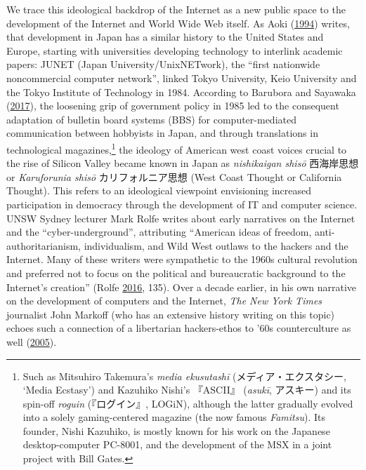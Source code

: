 \documentclass[10pt,british,A4paper,twoside]{memoir}
\begin{document}
We trace this ideological backdrop of the Internet as a new public space
to the development of the Internet and World Wide Web itself. As Aoki
(\protect\hyperlink{ref-aoki_virtual_1994}{1994}) writes, that
development in Japan has a similar history to the United States and
Europe, starting with universities developing technology to interlink
academic papers: JUNET (Japan University/UnixNETwork), the ``first
nationwide noncommercial computer network'', linked Tokyo University,
Keio University and the Tokyo Institute of Technology in 1984. According
to Barubora and Sayawaka
(\protect\hyperlink{ref-barubora_eng:_2017}{2017}), the loosening grip
of government policy in 1985 led to the consequent adaptation of
bulletin board systems (BBS) for computer-mediated communication between
hobbyists in Japan, and through translations in technological
magazines,\footnote{Such as Mitsuhiro Takemura's \emph{media ekusutashī}
  (メディア・エクスタシー, `Media Ecstasy') and Kazuhiko Nishi's
  『ASCII』 (\emph{asukī}, アスキー) and its spin-off \emph{roguin}
  (『ログイン』, LOGiN), although the latter gradually evolved into a
  solely gaming-centered magazine (the now famous \emph{Famitsu}). Its
  founder, Nishi Kazuhiko, is mostly known for his work on the Japanese
  desktop-computer PC-8001, and the development of the MSX in a joint
  project with Bill Gates.} the ideology of American west coast voices
crucial to the rise of Silicon Valley became known in Japan as
\emph{nishikaigan shisō} 西海岸思想 or \emph{Karuforunia shisō}
カリフォルニア思想 (West Coast Thought or California Thought). This
refers to an ideological viewpoint envisioning increased participation
in democracy through the development of IT and computer science. UNSW
Sydney lecturer Mark Rolfe writes about early narratives on the Internet
and the ``cyber-underground'', attributing ``American ideas of freedom,
anti-authoritarianism, individualism, and Wild West outlaws to the
hackers and the Internet. Many of these writers were sympathetic to the
1960s cultural revolution and preferred not to focus on the political
and bureaucratic background to the Internet's creation'' (Rolfe
\protect\hyperlink{ref-rolfe_reinvention_2016}{2016}, 135). Over a decade earlier, in
his own narrative on the development of computers and the Internet,
\emph{The New York Times} journalist John Markoff (who has an extensive
history writing on this topic) echoes such a connection of a libertarian
hackers-ethos to '60s counterculture as well
(\protect\hyperlink{ref-markoff_what_2005}{2005}).
\end{document}
